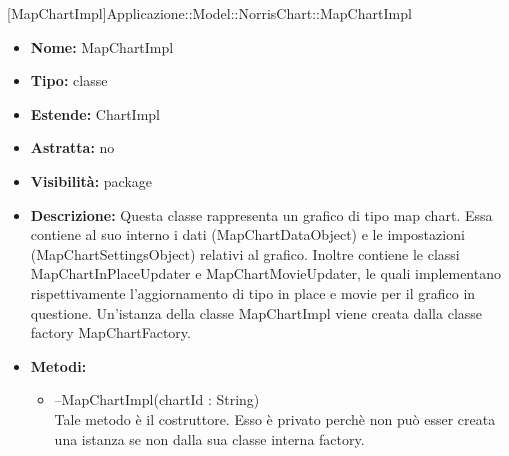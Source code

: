 			
			[MapChartImpl]{Applicazione::Model::NorrisChart::MapChartImpl}
			

	
			
			\begin{itemize}
			\item \textbf{Nome:} MapChartImpl
			\item \textbf{Tipo:} classe
			
		\item \textbf{Estende:}
		ChartImpl
		\item \textbf{Astratta:}
		no
			\item \textbf{Visibilità:} package
			\item \textbf{Descrizione:} Questa classe rappresenta un grafico di tipo map chart. Essa contiene al suo interno i dati (MapChartDataObject) e le impostazioni (MapChartSettingsObject) relativi al grafico. Inoltre contiene le classi MapChartInPlaceUpdater e MapChartMovieUpdater, le quali implementano rispettivamente l'aggiornamento di tipo in place e movie per il grafico in questione. Un'istanza della classe MapChartImpl viene creata dalla classe factory MapChartFactory.
			\item \textbf{Metodi:}
				\begin{itemize}
				\setlength{\itemsep}{5pt}
				
					\item[\ding{111}] {{--MapChartImpl(chartId : String)}} \\ [1mm] Tale metodo è il costruttore. Esso è privato perchè non può esser creata una istanza se non dalla sua classe interna factory.
				\end{itemize}
		
			\end{itemize}

